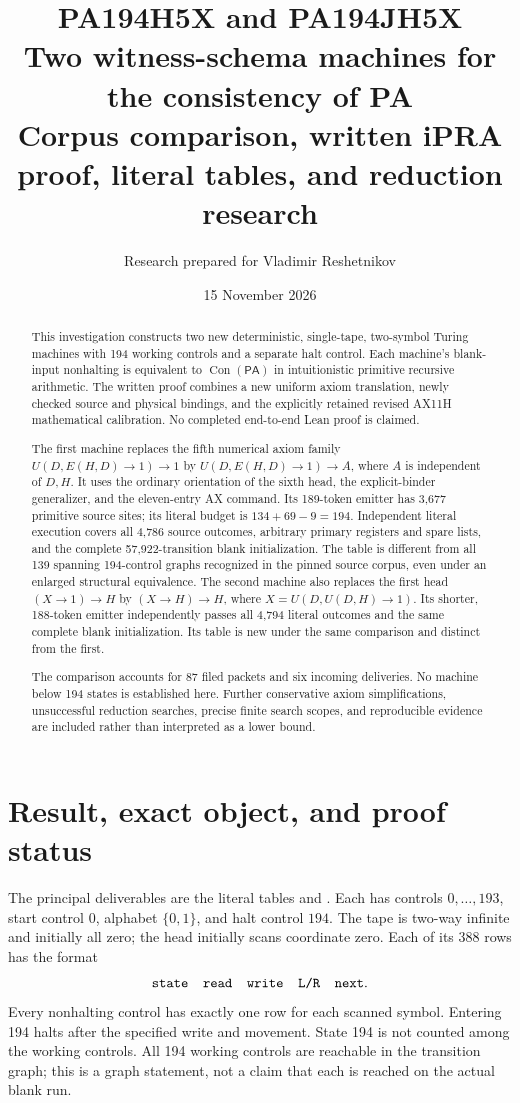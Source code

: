 \documentclass[11pt]{article}
\title{\color{ink}\textbf{PA194H5X and PA194JH5X}\\[5pt]
 Two witness-schema machines for the consistency of PA\\[7pt]
 \large Corpus comparison, written iPRA proof, literal tables, and reduction research}
\author{Research prepared for Vladimir Reshetnikov}
\date{15 November 2026}
\newcommand{\PA}{\mathsf{PA}}
\newcommand{\Con}{\operatorname{Con}}
\begin{document}
\maketitle
\begin{abstract}
This investigation constructs two new deterministic, single-tape, two-symbol
Turing machines with 194 working controls and a separate halt control.  Each
machine's blank-input nonhalting is equivalent to $\Con(\PA)$ in intuitionistic
primitive recursive arithmetic.  The written proof combines a new
uniform axiom translation, newly checked source and physical bindings,
and the explicitly retained revised AX11H mathematical calibration.
No completed end-to-end Lean proof is claimed.

The first machine replaces the fifth numerical axiom family
$U(D,E(H,D)\to1)\to1$ by $U(D,E(H,D)\to1)\to A$, where $A$ is
independent of $D,H$.  It uses the ordinary orientation of the sixth
head, the explicit-binder generalizer, and the eleven-entry AX command.
Its 189-token emitter has 3,677 primitive source sites; its literal budget
is $134+69-9=194$.  Independent literal execution covers all 4,786 source
outcomes, arbitrary primary registers and spare lists, and the complete
57,922-transition blank initialization.  The table is different from all
139 spanning 194-control graphs recognized in the pinned source corpus,
even under an enlarged structural equivalence.  The second machine also
replaces the first head $(X\to1)\to H$ by $(X\to H)\to H$, where
$X=U(D,U(D,H)\to1)$.  Its shorter, 188-token emitter independently passes
all 4,794 literal outcomes and the same complete blank initialization.
Its table is new under the same comparison and distinct from the first.

The comparison accounts for 87 filed packets and six incoming deliveries.
No machine below 194 states is established here.  Further conservative
axiom simplifications, unsuccessful reduction searches, precise finite
search scopes, and reproducible evidence are included rather than
interpreted as a lower bound.
\end{abstract}

\clearpage
\tableofcontents
\clearpage
\section{Result, exact object, and proof status}
\label{sec:result}

The principal deliverables are the literal tables
 and
.  Each has controls $0,\ldots,193$,
start control $0$, alphabet $\{0,1\}$, and halt control $194$.
The tape is two-way infinite and initially all zero; the head initially
scans coordinate zero.  Each of its 388 rows has the format
\[
 \texttt{state\quad read\quad write\quad L/R\quad next}.
\]
Every nonhalting control has exactly one row for each scanned symbol.
Entering 194 halts after the specified write and movement.  State 194 is
not counted among the working controls.  All 194 working controls are
reachable in the transition graph; this is a graph statement, not a
claim that each is reached on the actual blank run.
\end{document}
